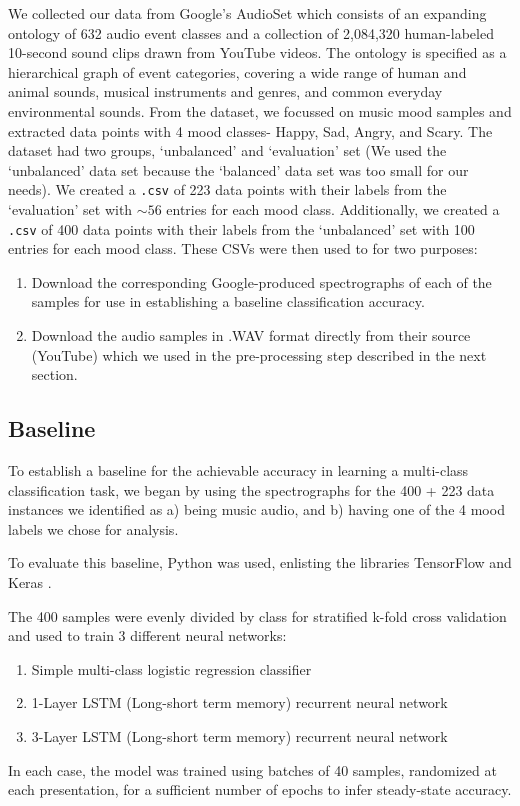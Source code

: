 \documentclass{article}
\begin{document}
We collected our data from Google’s AudioSet \cite{audioset} which consists of an expanding ontology of 632 audio event classes and a collection of 2,084,320 human-labeled 10-second sound clips drawn from YouTube videos. The ontology is specified as a hierarchical graph of event categories, covering a wide range of human and animal sounds, musical instruments and genres, and common everyday environmental sounds. From the dataset, we focussed on music mood samples and extracted data points with 4 mood classes- Happy, Sad, Angry, and Scary. The dataset had two groups, `unbalanced' and `evaluation' set (We used the `unbalanced' data set because the `balanced' data set was too small for our needs). We created a \texttt{.csv} of 223 data points with their labels from the `evaluation' set with $\sim 56$ entries for each mood class. Additionally, we created a \texttt{.csv} of 400 data points with their labels from the `unbalanced' set with 100 entries for each mood class. These CSVs were then used to for two purposes:
\begin{enumerate}
\item Download the corresponding Google-produced spectrographs of each of the samples for use in establishing a baseline classification accuracy.
\item Download the audio samples in .WAV format directly from their source (YouTube) which we used in the pre-processing step described in the next section.
\end{enumerate}


\subsection{Baseline}

To establish a baseline for the achievable accuracy in learning a  multi-class classification task, we began by using the spectrographs for the 400 + 223 data instances we identified as a) being music audio, and b) having one of the 4 mood labels we chose for analysis.

To evaluate this baseline, Python was used, enlisting the libraries TensorFlow \cite{tensorflow} and Keras \cite{keras}.

The 400 samples were evenly divided by class for stratified k-fold cross validation and used to train 3 different neural networks:
\begin{enumerate}
\item Simple multi-class logistic regression classifier
\item 1-Layer LSTM (Long-short term memory) recurrent neural network
\item 3-Layer LSTM (Long-short term memory) recurrent neural network
\end{enumerate}
In each case, the model was trained using batches of 40 samples, randomized at each presentation, for a sufficient number of epochs to infer steady-state accuracy.
\end{document}
